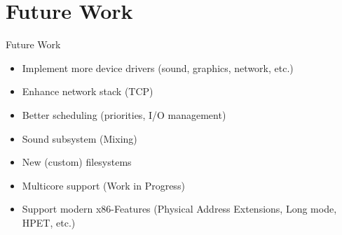 \section{Future Work}

\begin{frame}{Future Work}
	\begin{itemize}
		\setlength\itemsep{1em}
		\item Implement more device drivers (sound, graphics, network, etc.)
		\item Enhance network stack (TCP)
		\item Better scheduling (priorities, I/O management)
		\item Sound subsystem (Mixing)
		\item New (custom) filesystems
		\item Multicore support (Work in Progress)
		\item Support modern x86-Features (Physical Address Extensions, Long mode, HPET, etc.)
	\end{itemize}	
\end{frame}